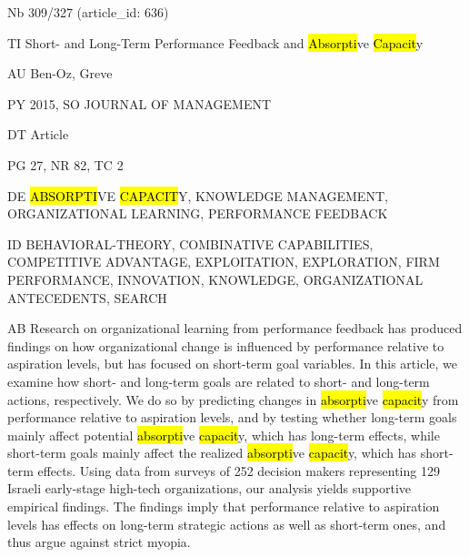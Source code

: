 \documentclass[a4paper]{article}
\begin{document}
\vspace*{-2cm}
Nb \tabto{0cm}309/327 (article\_id: 636)\par
TI \tabto{0cm}Short- and Long-Term Performance Feedback and \hl{Absorpti}ve \hl{Capacit}y\par
AU \tabto{0cm}Ben-Oz, Greve\par
PY \tabto{0cm}2015, SO JOURNAL OF MANAGEMENT\par
DT \tabto{0cm}Article\par
PG \tabto{0cm}27, NR 82, TC 2\par
DE \tabto{0cm}\hl{ABSORPTI}VE \hl{CAPACIT}Y, KNOWLEDGE MANAGEMENT, ORGANIZATIONAL LEARNING, PERFORMANCE FEEDBACK\par
ID \tabto{0cm}BEHAVIORAL-THEORY, COMBINATIVE CAPABILITIES, COMPETITIVE ADVANTAGE, EXPLOITATION, EXPLORATION, FIRM PERFORMANCE, INNOVATION, KNOWLEDGE, ORGANIZATIONAL ANTECEDENTS, SEARCH\par
AB \tabto{0cm}Research on organizational learning from performance feedback has produced findings on how organizational change is influenced by performance relative to aspiration levels, but has focused on short-term goal variables. In this article, we examine how short- and long-term goals are related to short- and long-term actions, respectively. We do so by predicting changes in \hl{absorpti}ve \hl{capacit}y from performance relative to aspiration levels, and by testing whether long-term goals mainly affect potential \hl{absorpti}ve \hl{capacit}y, which has long-term effects, while short-term goals mainly affect the realized \hl{absorpti}ve \hl{capacit}y, which has short-term effects. Using data from surveys of 252 decision makers representing 129 Israeli early-stage high-tech organizations, our analysis yields supportive empirical findings. The findings imply that performance relative to aspiration levels has effects on long-term strategic actions as well as short-term ones, and thus argue against strict myopia.\par
\clearpage
\end{document}
